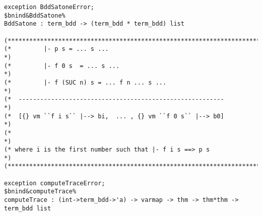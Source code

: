 \documentclass[12pt]{article}
\begin{document}
\begin{footnotesize}
\begin{Verbatim}[commandchars=\$\&\%]
exception BddSatoneError;
$bnind&BddSatone%
BddSatone : term_bdd -> (term_bdd * term_bdd) list

(*****************************************************************************)
(*         |- p s = ... s ...                                                *)
(*         |- f 0 s  = ... s ...                                             *)
(*         |- f (SUC n) s = ... f n ... s ...                                *)
(*  ---------------------------------------------------------                *)
(*  [{} vm ``f i s`` |--> bi,  ... , {} vm ``f 0 s`` |--> b0]                *)
(*                                                                           *)
(* where i is the first number such that |- f i s ==> p s                    *)
(*****************************************************************************)

exception computeTraceError;
$bnind&computeTrace%
computeTrace : (int->term_bdd->'a) -> varmap -> thm -> thm*thm -> term_bdd list





\end{Verbatim}
\end{footnotesize}
\end{document}

